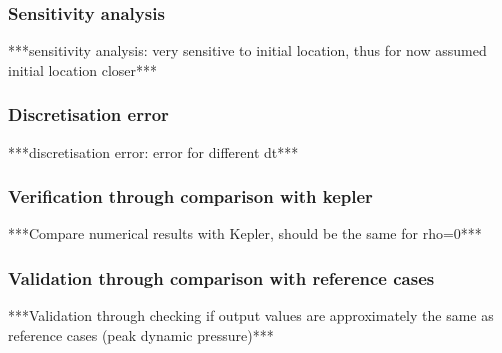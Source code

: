\subsubsection{Sensitivity analysis}
\label{sec:astrosens}
***sensitivity analysis: very sensitive to initial location, thus for now assumed initial location closer***\\

\subsubsection{Discretisation error}
\label{sec:astrodisc}
***discretisation error: error for different dt***\\

\subsubsection{Verification through comparison with kepler}
\label{sec:astroverf}
***Compare numerical results with Kepler, should be the same for rho=0***\\

\subsubsection{Validation through comparison with reference cases}
\label{sec:astroval}
***Validation through checking if output values are approximately the same as reference cases (peak dynamic pressure)***\\


